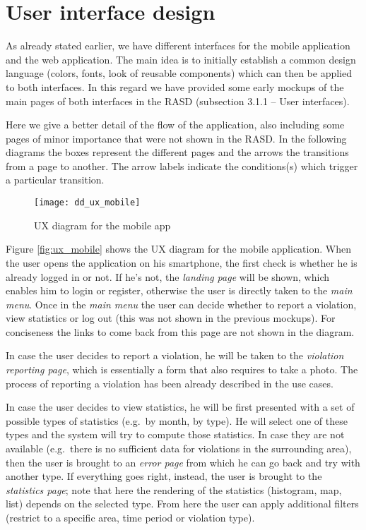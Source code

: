 \chapter{User interface design}
\label{ch:ui_design}
As already stated earlier, we have different interfaces for the mobile
application and the web application.
The main idea is to initially establish a common design language (colors,
fonts, look of reusable components) which can then be applied to both
interfaces. In this regard we have provided some early mockups of the main pages
of both interfaces in the RASD (subsection 3.1.1 -- User interfaces).

Here we give a better detail of the flow of the application, also including
some pages of minor importance that were not shown in the RASD.
In the following diagrams the boxes represent the different pages and the
arrows the transitions from a page to another. The arrow labels indicate the
conditions(s) which trigger a particular transition.

\begin{figure}[ht]
    \centering
    \texttt{[image: dd\_ux\_mobile]}
    \caption{UX diagram for the mobile app}
    \label{fig:ux_mobile}
\end{figure}

Figure \vref{fig:ux_mobile} shows the UX diagram for the mobile application.
When the user opens the application on his smartphone, the first check is
whether he is already logged in or not. If he's not, the \emph{landing page}
will be shown, which enables him to login or register, otherwise the user
is directly taken to the \emph{main menu}.
Once in the \emph{main menu} the user can decide whether to report a violation,
view statistics or log out (this was not shown in the previous mockups).
For conciseness the links to come back from this page are not shown in the
diagram.

In case the user decides to report a violation, he will be taken to the
\emph{violation reporting page}, which is essentially a form that also
requires to take a photo. The process of reporting a violation has been already
described in the use cases.

In case the user decides to view statistics, he will be first presented
with a set of possible types of statistics (e.g.\ by month, by type).
He will select one of these types and the system will try to compute those
statistics. In case they are not available (e.g.\ there is no sufficient data
for violations in the surrounding area), then the user is brought to an
\emph{error page} from which he can go back and try with another type.
If everything goes right, instead, the user is brought to the
\emph{statistics page}; note that here the rendering of the statistics
(histogram, map, list) depends on the selected type. From here the user
can apply additional filters (restrict to a specific area, time period
or violation type).

